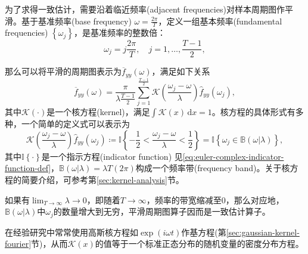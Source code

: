 为了求得一致估计，需要沿着临近频率(adjacent frequencies)对样本周期图作平滑。基于基准频率(base frequency) $\omega = \frac{2 \pi}{T}$，定义一组基本频率(fundamental frequencies) $\left\{ \omega_{j} \right\}$，是基准频率的整数倍：
\begin{equation*}
  \omega_{j} = j \frac{2 \pi}{T}, \quad j = 1, \ldots, \frac{T-1}{2},
\end{equation*}

那么可以将平滑的周期图表示为$\overline{f}_{yy} \left( \omega \right)$，满足如下关系
\begin{equation}
  \label{eq:spectral-periodgram-smooth}
  \overline{f}_{yy} \left( \omega \right)  =
  \frac{\pi}{ \lambda \frac{T-1}{2}} \sum_{j=1}^{\frac{T-1}{2}}
  \mathcal{K} \left( \frac{\omega_{j} - \omega}{\lambda} \right)
  \hat{f}_{yy} \left( \omega_{j} \right),
\end{equation}
其中$\mathcal{K}(\cdot)$是一个核方程(kernel)，满足$\int \mathcal{K}(x) \, \mathrm{d} x = 1$。核方程的具体形式有多种，一个简单的定义式可以表示为
\begin{equation}
  \label{eq:spectral-periodgram-smooth-kernel-def}
  \mathcal{K} \left( \frac{\omega_{j} - \omega}{\lambda} \right)
  \hat{f}_{yy} \left( \omega_{j} \right)
  \coloneqq \mathbb{I}
  \left\{
  - \frac{1}{2} < \frac{\omega_{j} - \omega }{\lambda} < \frac{1}{2}
  \right\}
  = \mathbb{I}
  \left\{
    \omega_{j} \in
    \mathbb{B} \left( \omega | \lambda \right)
  \right\},
\end{equation}
其中$\mathbb{I} \left\{ \cdot \right\}$是一个指示方程(indicator function)
见\eqref{eq:euler-complex-indicator-function-def}，$\mathbb{B} \left( \omega | \lambda \right) = \lambda T \left( 2 \pi \right)$构成一个频率带(frequency band)。关于核方程的简要介绍，可参考第\ref{sec:kernel-analysis}节。

如果有$\lim_{T \rightarrow \infty} \lambda \rightarrow 0$，即随着$T \rightarrow \infty$，频率的带宽缩减至$0$，那么对应地，$\mathbb{B} \left( \omega | \lambda \right)$中$\omega_{j}$的数量增大到无穷，平滑周期图算子因而是一致估计算子。

在经验研究中常常使用高斯核方程如$\exp \left( i \omega t \right)$作基方程(第\ref{sec:gaussian-kernel-fourier}节)，从而$\mathcal{K}(x)$的值等于一个标准正态分布的随机变量的密度分布方程。
